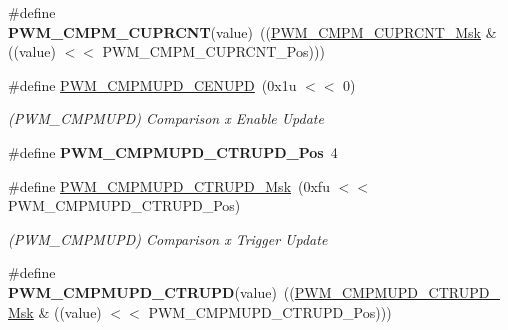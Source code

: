 \begin{DoxyCompactItemize}
\mbox{\label{group__SAMS70__PWM_gae1103977edb4f7f53e3050ded3900262}} 
\#define {\bfseries P\+W\+M\+\_\+\+C\+M\+P\+M\+\_\+\+C\+U\+P\+R\+C\+NT}(value)~((\mbox{\hyperlink{group__SAMV71__PWM_ga2fbf78eae63da097297b020afcf6febe}{P\+W\+M\+\_\+\+C\+M\+P\+M\+\_\+\+C\+U\+P\+R\+C\+N\+T\+\_\+\+Msk}} \& ((value) $<$$<$ P\+W\+M\+\_\+\+C\+M\+P\+M\+\_\+\+C\+U\+P\+R\+C\+N\+T\+\_\+\+Pos)))
\item 
\mbox{\label{group__SAMS70__PWM_ga63120711aff24e164abacbf8283ad2f0}} 
\#define \mbox{\hyperlink{group__SAMS70__PWM_ga63120711aff24e164abacbf8283ad2f0}{P\+W\+M\+\_\+\+C\+M\+P\+M\+U\+P\+D\+\_\+\+C\+E\+N\+U\+PD}}~(0x1u $<$$<$ 0)
\begin{DoxyCompactList}\small\item\em (P\+W\+M\+\_\+\+C\+M\+P\+M\+U\+PD) Comparison x Enable Update \end{DoxyCompactList}\item 
\mbox{\label{group__SAMS70__PWM_gaa51d75e45c3eb87cf7a0c94d36919e29}} 
\#define {\bfseries P\+W\+M\+\_\+\+C\+M\+P\+M\+U\+P\+D\+\_\+\+C\+T\+R\+U\+P\+D\+\_\+\+Pos}~4
\item 
\mbox{\label{group__SAMS70__PWM_gae4963293459d57314102b2a14c2d9c89}} 
\#define \mbox{\hyperlink{group__SAMS70__PWM_gae4963293459d57314102b2a14c2d9c89}{P\+W\+M\+\_\+\+C\+M\+P\+M\+U\+P\+D\+\_\+\+C\+T\+R\+U\+P\+D\+\_\+\+Msk}}~(0xfu $<$$<$ P\+W\+M\+\_\+\+C\+M\+P\+M\+U\+P\+D\+\_\+\+C\+T\+R\+U\+P\+D\+\_\+\+Pos)
\begin{DoxyCompactList}\small\item\em (P\+W\+M\+\_\+\+C\+M\+P\+M\+U\+PD) Comparison x Trigger Update \end{DoxyCompactList}\item 
\mbox{\label{group__SAMS70__PWM_gaa7fb8523c1acf3002ed4e7e9097af440}} 
\#define {\bfseries P\+W\+M\+\_\+\+C\+M\+P\+M\+U\+P\+D\+\_\+\+C\+T\+R\+U\+PD}(value)~((\mbox{\hyperlink{group__SAMV71__PWM_gae4963293459d57314102b2a14c2d9c89}{P\+W\+M\+\_\+\+C\+M\+P\+M\+U\+P\+D\+\_\+\+C\+T\+R\+U\+P\+D\+\_\+\+Msk}} \& ((value) $<$$<$ P\+W\+M\+\_\+\+C\+M\+P\+M\+U\+P\+D\+\_\+\+C\+T\+R\+U\+P\+D\+\_\+\+Pos)))
\item 
\mbox{\label{group__SAMS70__PWM_ga172bcf93f25ed51f493dff85c9ab569a}} 

\end{DoxyCompactItemize}

